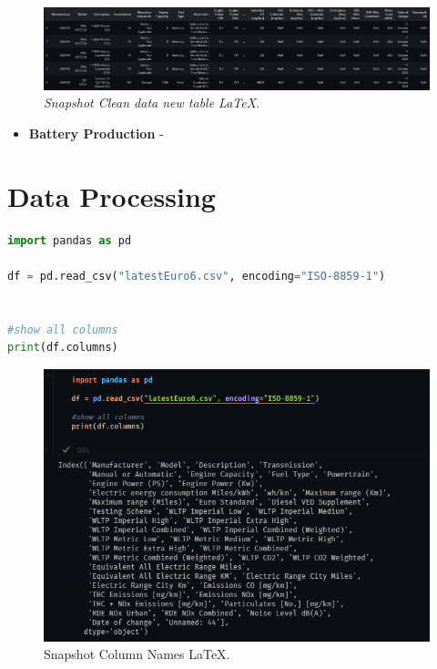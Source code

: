  \begin{figure}[H]
    \centering
    \includegraphics[scale=0.35]{figures/Vehicle Emissions.png}
    \caption{\textit{Snapshot Clean data new table \LaTeX}.}
    \label{fig:chart_1}
\end{figure}
\begin{itemize}
    \item \textbf{Battery Production} - 
\end{itemize}
 


\section{Data Processing}
\begin{lstlisting}[language=Python, caption={Code snippet in \LaTeX ~and  this is a Python code }, label=list:python_code_ex]
import pandas as pd

df = pd.read_csv("latestEuro6.csv", encoding="ISO-8859-1")


#show all columns
print(df.columns)
\end{lstlisting}
\begin{figure}[H]
    \centering
    \includegraphics[scale=0.85]{figures/ColumnNames.png}
    \caption{Snapshot Column Names \LaTeX.}
    \label{fig:chart_1}
\end{figure}

